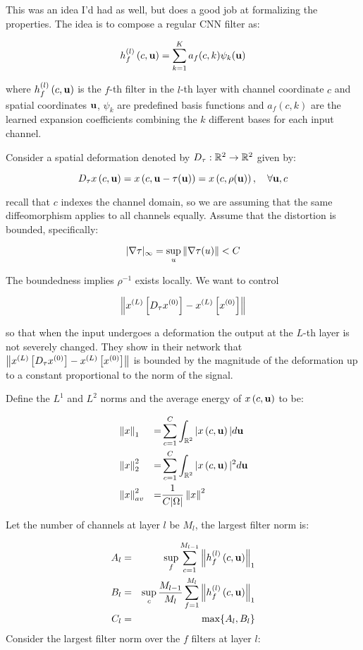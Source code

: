 This was an idea I'd had as well, but \cite{qiu_dcfnet:_2018} does a good job at
formalizing the properties. The idea is to compose a regular CNN filter as: 

$$ \cnnfilt{l}{f}{c}{\xy} = \sum_{k=1}^K a_{f}(c, k) \psi_k (\xy) $$

where $\cnnfilt{l}{f}{c}{\xy}$ is the $f$-th filter in the $l$-th layer with channel
coordinate $c$ and spatial coordinates $\xy$, $\psi_k$ are predefined basis
functions and $a_{f}(c, k)$ are the learned expansion coefficients combining the
$k$ different bases for each input channel.


Consider a spatial deformation denoted by 
$D_\tau : \reals[2] \rightarrow \reals[2]$ given by:

$$D_{\tau} \cnnact{x}{c}{\xy} = \cnnact{x}{c}{\xy - \tau(\xy)} = \cnnact{x}{c}{\rho(\xy)}, \quad \forall \xy, c $$

recall that $c$ indexes the channel domain, so we are assuming that the
same diffeomorphism applies to all channels equally. Assume that the distortion
is bounded, specifically:

$$ |\nabla \tau|_{\infty} = \sup_{u} \norm{\nabla \tau(u) } < C $$

The boundedness implies $\rho^{-1}$ exists locally. We want to control

$$ \norm{ x^{(L)} \left[ D_\tau x^{(0)} \right] - x^{(L)} \left[ x^{(0)} \right]} $$

so that when the input undergoes a deformation the output at the $L$-th layer is
not severely changed. They show in their network that 
$ \norm{ x^{(L)} \left[ D_\tau x^{(0)} \right] - x^{(L)} \left[ x^{(0)} \right]} $
is bounded by the magnitude of the deformation up to a constant proportional to
the norm of the signal.

Define the $L^1$ and $L^2$ norms and the average energy of $\cnnact{x}{c}{\xy}$ to be:

\begin{eqnarray}
  & \norm{x}_1 &=& \sum_{c = 1}^{C} \int_{\reals[2]} |\cnnact{x}{c}{\xy}| d\xy \\
  & \norm{x}_2^{2} &=& \sum_{c = 1}^{C} \int_{\reals[2]} |\cnnact{x}{c}{\xy}|^2 d\xy  \\
  & \norm{x}^2_{av} &=& \frac{1}{C |\Omega|} \norm{x}^2 
\end{eqnarray}

Let the number of channels at layer $l$ be $M_l$, the largest filter norm is:

\begin{eqnarray}
  A_l & = &  \sup_{f} \sum_{c=1}^{M_{l-1}} \norm{ \cnnfilt{l}{f}{c}{\xy} }_1 \\
  B_l & = & \sup_{c} \frac{M_{l-1}}{M_l} \sum_{f=1}^{M_l} \norm{ \cnnfilt{l}{f}{c}{\xy} }_1 \\
  C_l & = & \max \{ A_l, B_l \} \\

\end{eqnarray}
Consider the largest filter norm over the $f$ filters at layer $l$:

